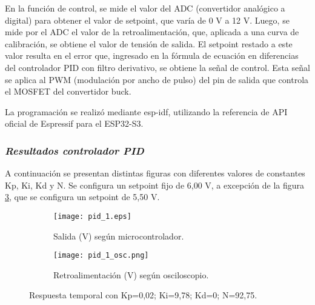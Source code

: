 En la función de control, se mide el valor del ADC (convertidor analógico a digital) para obtener el
valor de setpoint, que varía de 0 V a 12 V. Luego, se mide por el ADC el valor de la retroalimentación, que, aplicada
a una curva de calibración, se obtiene el valor de tensión de salida. El setpoint restado a este valor resulta en
el error que, ingresado en la fórmula de ecuación en diferencias del controlador PID con filtro derivativo, se obtiene
la señal de control. Esta señal se aplica al PWM (modulación por ancho de pulso) del pin de salida que controla
el MOSFET del convertidor buck.

La programación se realizó mediante esp-idf, utilizando la referencia de API oficial de Espressif para el ESP32-S3. \parencite{ESPIDF}

\subsubsection*{\it{Resultados controlador PID}}
\vspace{-0.25cm}

A continuación se presentan distintas figuras con diferentes valores de constantes Kp, Ki, Kd y N. Se configura
un setpoint fijo de 6,00 V, a excepción de la figura \ref{fig:pid1}, que se configura un setpoint de 5,50 V.

\begin{figure}[H]
    \centering

    \begin{subfigure}[b]{0.49\textwidth}
        \centering
        \texttt{[image: pid\_1.eps]}
        \caption{Salida (V) según microcontrolador.}
        \label{fig:pid1_micro}
    \end{subfigure}
    \begin{subfigure}[b]{0.49\textwidth}
        \centering
        \texttt{[image: pid\_1\_osc.png]}
        \caption{Retroalimentación (V) según osciloscopio.}
        \label{fig:pid1_osciloscopio}
    \end{subfigure}

    \vspace{-0.25cm}
    \caption{Respuesta temporal con Kp=0,02; Ki=9,78; Kd=0; N=92,75.}
    \label{fig:pid1}
\end{figure}
\vspace{-0.5cm}

